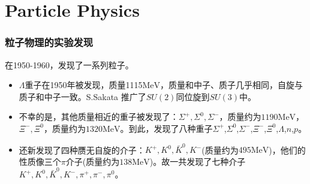 \documentclass[CJK]{beamer}
\begin{document}
\section{Particle Physics}
\begin{frame}\frametitle{\bch 粒子物理的实验发现\ech}
  \bch
  在1950-1960，发现了一系列粒子。
  \begin{itemize}
  \item $\Lambda$重子在1950年被发现，质量1115$\mathrm{MeV}$，质量和中子、质子几乎相同，自旋与质子和中子一致。S.Sakata 推广了$SU(2)$同位旋到$SU(3)$中。
  \item 不幸的是，其他质量相近的重子被发现了：$\Sigma^{+},\Sigma^0,\Sigma^-$，质量约为$1190\mathrm{MeV}$，$\Xi^-,\Xi^0$，质量约为$1320\mathrm{MeV}$。到此，发现了八种重子$\Sigma^{+}$,$\Sigma^0$,$\Sigma^-$,$\Xi^-$,$\Xi^0$,$\Lambda$,$n$,$p$。
    \item 还新发现了四种赝无自旋的介子：$K^+,K^0,\bar{K}^0,K^-$(质量约为$495\mathrm{MeV}$)，他们的性质像三个$\pi$介子(质量约为$138\mathrm{MeV}$)。故一共发现了七种介子$K^+,K^0,\bar{K}^0,K^-,\pi^+,\pi^-,\pi^0$。
  \end{itemize}
  \ech
\end{frame}
\end{document}
